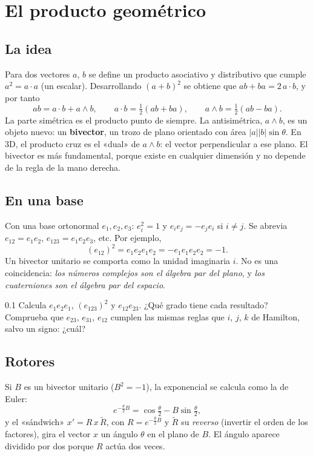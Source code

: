 \documentclass[11pt,a4paper]{article}
\numberwithin{equation}{section}
\newcommand{\rev}[1]{\widetilde{#1}}
\begin{document}
\section{El producto geométrico}

\subsection{La idea}
Para dos vectores $a$, $b$ se define un producto asociativo y distributivo que cumple $a^2 = a\cdot a$ (un escalar).
Desarrollando $(a+b)^2$ se obtiene que $ab + ba = 2\,a\cdot b$, y por tanto
\begin{equation}
  ab = a\cdot b + a\wedge b,\qquad a\cdot b = \tfrac12(ab + ba),\qquad a\wedge b = \tfrac12(ab - ba).
\end{equation}
La parte simétrica es el producto punto de siempre. La antisimétrica, $a\wedge b$, es un objeto nuevo: un
\textbf{bivector}, un trozo de plano orientado con área $\lvert a\rvert\lvert b\rvert\sin\theta$. En 3D, el producto
cruz es el «dual» de $a\wedge b$: el vector perpendicular a ese plano. El bivector es más fundamental, porque existe en
cualquier dimensión y no depende de la regla de la mano derecha.

\subsection{En una base}
Con una base ortonormal $e_1,e_2,e_3$: $e_i^2 = 1$ y $e_ie_j = -e_je_i$ si $i\ne j$. Se abrevia $e_{12} = e_1e_2$,
$e_{123} = e_1e_2e_3$, etc. Por ejemplo,
\begin{equation}
  (e_{12})^2 = e_1e_2e_1e_2 = -e_1e_1e_2e_2 = -1 .
\end{equation}
Un bivector unitario se comporta como la unidad imaginaria $i$. No es una coincidencia: \emph{los números complejos son
el álgebra par del plano}, y \emph{los cuaterniones son el álgebra par del espacio}.

\begin{ejercicio}{0.1}
Calcula $e_1e_2e_1$, $(e_{123})^2$ y $e_{12}e_{23}$. ¿Qué grado tiene cada resultado? Comprueba que
$e_{23}$, $e_{31}$, $e_{12}$ cumplen las mismas reglas que $i$, $j$, $k$ de Hamilton, salvo un signo: ¿cuál?
\end{ejercicio}

\subsection{Rotores}
Si $B$ es un bivector unitario ($B^2 = -1$), la exponencial se calcula como la de Euler:
\begin{equation}
  e^{-\frac{\theta}{2}B} = \cos\tfrac{\theta}{2} - B\sin\tfrac{\theta}{2},
\end{equation}
y el «sándwich» $x' = R\,x\,\rev{R}$, con $R = e^{-\frac{\theta}{2}B}$ y $\rev{R}$ su \emph{reverso} (invertir el
orden de los factores), gira el vector $x$ un ángulo $\theta$ en el plano de $B$. El ángulo aparece dividido por dos
porque $R$ actúa dos veces.
\end{document}
